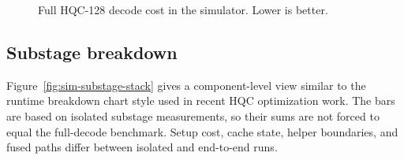 \documentclass[runningheads]{llncs}
\begin{document}
\begin{figure}[t]
\centering
{}
\caption{Full HQC-128 decode cost in the simulator.  Lower is better.}
\label{fig:sim-full-bars}
\end{figure}

\subsection{Substage breakdown}

Figure~\ref{fig:sim-substage-stack} gives a component-level view similar to
the runtime breakdown chart style used in recent HQC optimization work.  The
bars are based on isolated substage measurements, so their sums are not forced
to equal the full-decode benchmark.  Setup cost, cache state, helper
boundaries, and fused paths differ between isolated and end-to-end runs.
\end{document}
